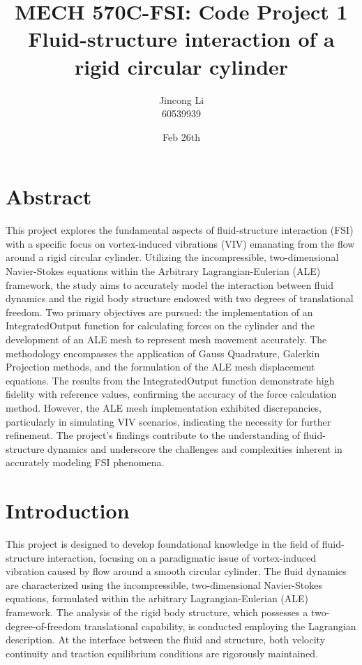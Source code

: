 \documentclass[a4paper,12pt]{article} %
\begin{document}
\setlength{\parskip}{1em} 
\setlength{\parindent}{0pt}
\newcommand{\vect}[1]{\mathbf{#1}}

\title{MECH 570C-FSI: Code Project 1 \\Fluid-structure interaction of a rigid circular cylinder}
\author{Jincong Li \\ 60539939}
\date{Feb 26th}
\maketitle

\section*{Abstract}
This project explores the fundamental aspects of fluid-structure interaction (FSI) with a specific 
focus on vortex-induced vibrations (VIV) emanating from the flow around a rigid circular cylinder.
 Utilizing the incompressible, two-dimensional Navier-Stokes equations within the Arbitrary Lagrangian-Eulerian 
 (ALE) framework, the study aims to accurately model the interaction between fluid dynamics and the rigid body 
 structure endowed with two degrees of translational freedom. Two primary objectives are pursued: the 
 implementation of an IntegratedOutput function for calculating forces on the cylinder and the development 
 of an ALE mesh to represent mesh movement accurately. The methodology encompasses the application of Gauss
  Quadrature, Galerkin Projection methods, and the formulation of the ALE mesh displacement equations. 
  The results from the IntegratedOutput function demonstrate high fidelity with reference values, confirming 
  the accuracy of the force calculation method. However, the ALE mesh implementation exhibited discrepancies, 
  particularly in simulating VIV scenarios, indicating the necessity for further refinement. The project's 
  findings contribute to the understanding of fluid-structure dynamics and underscore the challenges and 
  complexities inherent in accurately modeling FSI phenomena.

\section*{Introduction}
This project is designed to develop foundational knowledge in the field of fluid-structure interaction, 
focusing on a paradigmatic issue of vortex-induced vibration caused by flow around a smooth circular 
cylinder. The fluid dynamics are characterized using the incompressible, two-dimensional Navier-Stokes equations, 
formulated within the arbitrary Lagrangian-Eulerian (ALE) framework. The analysis of the rigid body structure,
which possesses a two-degree-of-freedom translational capability, is conducted employing the Lagrangian 
description. At the interface between the fluid and structure, both velocity continuity and traction 
equilibrium conditions are rigorously maintained.
\end{document}
